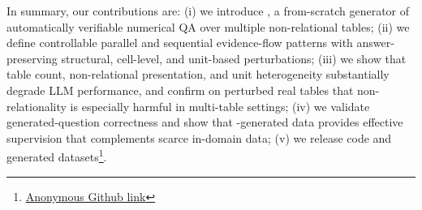 In summary, our contributions are:
(i) we introduce \name, a from-scratch generator of automatically verifiable numerical QA over multiple non-relational tables;
(ii) we define controllable parallel and sequential evidence-flow patterns with answer-preserving structural, cell-level, and unit-based perturbations;
(iii) we show that table count, non-relational presentation, and unit heterogeneity substantially degrade LLM performance, and confirm on perturbed real tables that non-relationality is especially harmful in multi-table settings;
(iv) we validate generated-question correctness and show that \name-generated data provides effective supervision that complements scarce in-domain data;
(v) we release code and generated datasets\footnote{\href{https://anonymous.4open.science/r/Gradino-DBF6/}{Anonymous Github link}}.